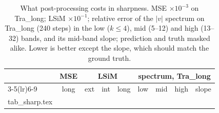 \documentclass[10pt]{article}
\begin{document}
\begin{table}[!htbp]
\centering\scriptsize
\caption{What post-processing costs in sharpness. MSE $\times10^{-3}$ on Tra\_long; LSiM
$\times10^{-1}$; relative error of the $|v|$ spectrum on Tra\_long (240 steps) in the low ($k\le4$),
mid (5--12) and high (13--32) bands, and its mid-band slope; prediction and truth masked alike. Lower is better except the slope, which
should match the ground truth.}
\label{tab:sharp}
\begin{tabular}{lcccccccc}
\toprule
 & MSE & \multicolumn{3}{c}{LSiM} & \multicolumn{4}{c}{spectrum, Tra\_long}\\
\cmidrule(lr){3-5}\cmidrule(lr){6-9}
 & long & ext & int & long & low & mid & high & slope\\
\midrule
{} tab_sharp.tex
\bottomrule
\end{tabular}
\end{table}
\end{document}
